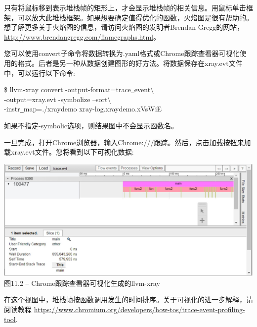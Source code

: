 只有将鼠标移到表示堆栈帧的矩形上，才会显示堆栈帧的相关信息。用鼠标单击框架，可以放大此堆栈框架。如果想要确定值得优化的函数，火焰图是很有帮助的。想了解更多关于火焰图的信息，请访问火焰图的发明者Brendan Gregg的网站，\url{http://www.brendangregg.com/flamegraphs.html}。\par

您可以使用convert子命令将数据转换为.yaml格式或Chrome跟踪查看器可视化使用的格式。后者是另一种从数据创建图形的好方法。将数据保存在xray.evt文件中，可以运行以下命令:\par

\begin{tcolorbox}[colback=white,colframe=black]
\$ llvm-xray convert -output-format=trace\underline{~}event$\setminus$ \\
\hspace*{0.5cm}-output=xray.evt -symbolize –sort$\setminus$ \\
\hspace*{0.5cm}-instr\underline{~}map=./xraydemo xray-log.xraydemo.xVsWiE
\end{tcolorbox}

如果不指定-symbolic选项，则结果图中不会显示函数名。\par

一旦完成，打开Chrome浏览器，输入Chrome:///跟踪。然后，点击加载按钮来加载xray.evt文件。您将看到以下可视化数据:\par

\hspace*{\fill} \par %
\begin{center}
\includegraphics[width=1\textwidth]{content/3/chapter11/images/2.jpg}\\
图11.2 – Chrome跟踪查看器可视化生成的llvm-xray
\end{center}

在这个视图中，堆栈帧按函数调用发生的时间排序。关于可视化的进一步解释，请阅读教程 \url{https://www.chromium.org/developers/how-tos/trace-event-profiling-tool}.

